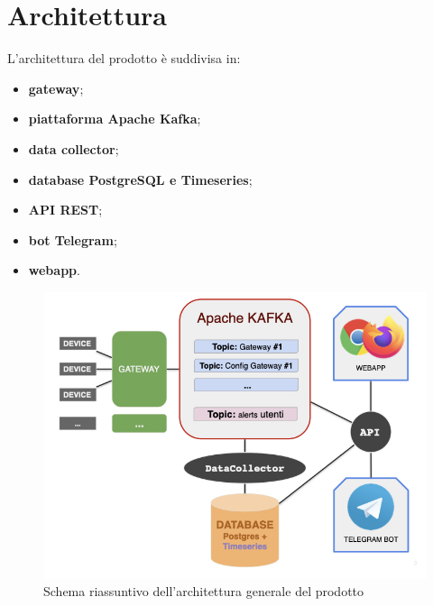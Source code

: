 \section{Architettura}

L'architettura del prodotto è suddivisa in:
	\begin{itemize}
	  	\item \textbf{gateway};
	  	\item \textbf{piattaforma Apache Kafka};
	  	\item \textbf{data collector};
	  	\item \textbf{database PostgreSQL e Timeseries};
	  	\item \textbf{API REST};
	  	\item \textbf{bot Telegram};
	  	\item \textbf{webapp}.    
	\end{itemize} 

	\begin{figure}[H]
		\centering
		\includegraphics[scale=0.600]{res/images/architetturaGenerale.jpeg}
		\caption{Schema riassuntivo dell'architettura generale del prodotto}
	\end{figure}
	
